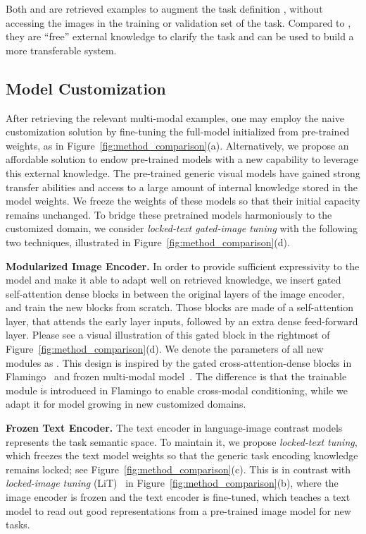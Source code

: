 \documentclass[10pt,twocolumn,letterpaper]{article}
\renewcommand{\paragraph}[1]{\vspace{1.25mm}\noindent\textbf{#1}}
\begin{document}
Both  and  are retrieved examples to augment the task definition , without accessing the images in the training or validation set of the task. Compared to , they are ``free'' external knowledge to clarify the task and can be used to build a more transferable system.


\subsection{Model Customization}
\vspace{-2mm}

After retrieving the relevant multi-modal examples, 
one may employ the naive customization solution by fine-tuning the full-model initialized from pre-trained weights, as in Figure~\ref{fig:method_comparison}(a).
Alternatively, we propose an affordable solution to endow pre-trained models with a new capability to leverage this external knowledge.
The pre-trained generic visual models have gained strong transfer
abilities and access to a large amount of internal knowledge stored in the model weights. We freeze the weights of these models so that their initial capacity remains unchanged. 
To bridge these pretrained models harmoniously to the customized domain, we consider {\it  locked-text gated-image tuning} with the following two techniques, illustrated in Figure~\ref{fig:method_comparison}(d). 

\paragraph{Modularized Image Encoder. } In order to provide sufficient expressivity to the model and make it able to adapt well on retrieved knowledge, we insert gated self-attention dense blocks in between the original layers of the image encoder, and train the new blocks from scratch. Those blocks are made of a self-attention layer, that attends the early layer inputs, followed by an extra dense feed-forward layer. Please see a visual illustration of this gated block in the rightmost of Figure~\ref{fig:method_comparison}(d).
We denote the parameters of all new modules as . This design is inspired by the gated cross-attention-dense blocks in Flamingo~\cite{alayrac2022flamingo}  and frozen multi-modal model~\cite{tsimpoukelli2021multimodal}. The difference is that the trainable module is introduced in Flamingo to enable cross-modal conditioning, while we adapt it for model growing in new customized domains. 

\paragraph{Frozen Text Encoder.} The text encoder in language-image contrast models represents the task semantic space. To maintain it, we propose {\it locked-text tuning}, which freezes the text model weights so that the generic task encoding knowledge remains locked; see Figure~\ref{fig:method_comparison}(c).   This is in contrast with {\it locked-image tuning} (LiT)~\cite{zhai2022lit} in Figure~\ref{fig:method_comparison}(b), where the image encoder is frozen and the text encoder is fine-tuned, which teaches a text model to read out good representations from a pre-trained image model for new tasks.
\end{document}
